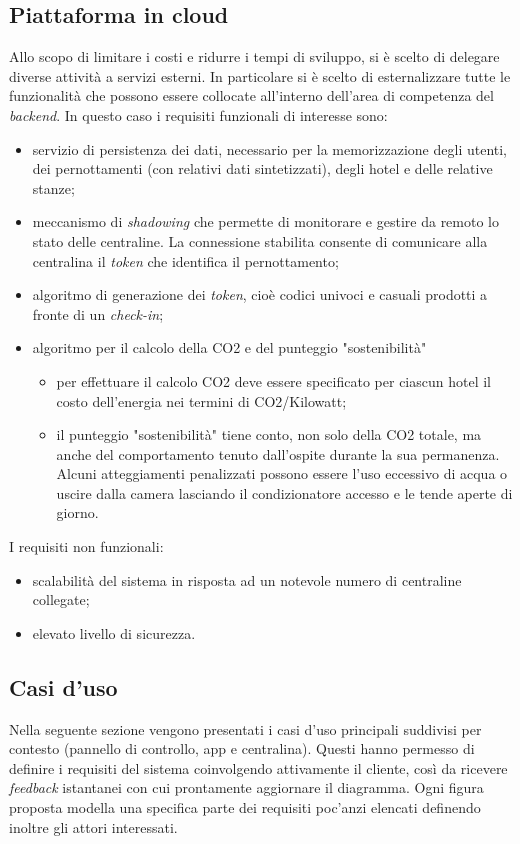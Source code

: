 \subsection*{Piattaforma in cloud}
Allo scopo di limitare i costi e ridurre i tempi di sviluppo, si è scelto di delegare diverse attività a servizi esterni. In particolare si è scelto di esternalizzare tutte le funzionalità che possono essere collocate all'interno dell'area di competenza del \textit{backend}.\newline\newline
%
In questo caso i requisiti funzionali di interesse sono:
\begin{itemize}
    \item servizio di persistenza dei dati, necessario per la memorizzazione degli utenti, dei pernottamenti (con relativi dati sintetizzati), degli hotel e delle relative stanze;
    \item meccanismo di \textit{shadowing} che permette di monitorare e gestire da remoto lo stato delle centraline. La connessione stabilita consente di comunicare alla centralina il \textit{token} che identifica il pernottamento;
    \item algoritmo di generazione dei \textit{token}, cioè codici univoci e casuali prodotti a fronte di un \textit{check-in};
    \item algoritmo per il calcolo della CO2 e del punteggio "sostenibilità"
    \begin{itemize}
        \item per effettuare il calcolo CO2 deve essere specificato per ciascun hotel il costo dell'energia nei termini di CO2/Kilowatt;
        \item il punteggio "sostenibilità" tiene conto, non solo della CO2 totale, ma anche del comportamento tenuto dall'ospite durante la sua permanenza. Alcuni atteggiamenti penalizzati possono essere l'uso eccessivo di acqua o uscire dalla camera lasciando il condizionatore accesso e le tende aperte di giorno.
    \end{itemize} 
\end{itemize}
%
I requisiti non funzionali:
\begin{itemize}
    \item scalabilità del sistema in risposta ad un notevole numero di centraline collegate;
    \item elevato livello di sicurezza.
\end{itemize}

\subsection{Casi d'uso}
Nella seguente sezione vengono presentati i casi d'uso principali suddivisi per contesto (pannello di controllo, app e centralina). Questi hanno permesso di definire i requisiti del sistema coinvolgendo attivamente il cliente, così da ricevere \textit{feedback} istantanei con cui prontamente aggiornare il diagramma. Ogni figura proposta modella una specifica parte dei requisiti poc'anzi elencati definendo inoltre gli attori interessati.

